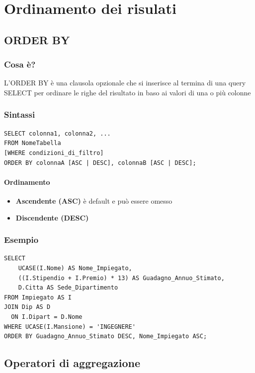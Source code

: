 \chapter{Ordinamento dei risulati}
\section{ORDER BY}
\subsection{Cosa è?}
L'ORDER BY è una clausola opzionale che si inserisce al termina di una query SELECT per ordinare le righe del risultato in baso ai valori di una o più colonne
\subsection{Sintassi}
\begin{lstlisting}[language=sql_generic]
SELECT colonna1, colonna2, ...
FROM NomeTabella
[WHERE condizioni_di_filtro]
ORDER BY colonnaA [ASC | DESC], colonnaB [ASC | DESC];
\end{lstlisting}
\subsubsection{Ordinamento}
\begin{itemize}
    \item \textbf{Ascendente (ASC)} è default e può essere omesso
    \item \textbf{Discendente (DESC)}
\end{itemize}
\subsection{Esempio}
\begin{lstlisting}[language=sql_generic]
SELECT 
    UCASE(I.Nome) AS Nome_Impiegato,
    ((I.Stipendio + I.Premio) * 13) AS Guadagno_Annuo_Stimato,
    D.Citta AS Sede_Dipartimento
FROM Impiegato AS I
JOIN Dip AS D 
  ON I.Dipart = D.Nome
WHERE UCASE(I.Mansione) = 'INGEGNERE'
ORDER BY Guadagno_Annuo_Stimato DESC, Nome_Impiegato ASC;
\end{lstlisting}

\section{Operatori di aggregazione}
